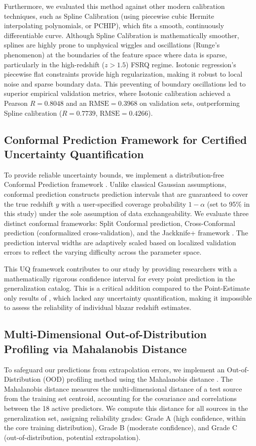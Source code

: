 \documentclass[twocolumn,linenumbers,floatfix]{aastex701}
\begin{document}
Furthermore, we evaluated this method against other modern calibration techniques, such as Spline Calibration (using piecewise cubic Hermite interpolating polynomials, or PCHIP), which fits a smooth, continuously differentiable curve. Although Spline Calibration is mathematically smoother, splines are highly prone to unphysical wiggles and oscillations (Runge's phenomenon) at the boundaries of the feature space where data is sparse, particularly in the high-redshift ($z > 1.5$) FSRQ regime. Isotonic regression's piecewise flat constraints provide high regularization, making it robust to local noise and sparse boundary data. This preventing of boundary oscillations led to superior empirical validation metrics, where Isotonic calibration achieved a Pearson $R = 0.8048$ and an $\text{RMSE} = 0.3968$ on validation sets, outperforming Spline calibration ($R = 0.7739$, $\text{RMSE} = 0.4266$).

\subsection{Conformal Prediction Framework for Certified Uncertainty Quantification}
\label{sec:conformal}
To provide reliable uncertainty bounds, we implement a distribution-free Conformal Prediction framework \citep{Vovk2005, Angelopoulos2021}. Unlike classical Gaussian assumptions, conformal prediction constructs prediction intervals that are guaranteed to cover the true redshift $y$ with a user-specified coverage probability $1-\alpha$ (set to 95\% in this study) under the sole assumption of data exchangeability. We evaluate three distinct conformal frameworks: Split Conformal prediction, Cross-Conformal prediction (conformalized cross-validation), and the Jackknife+ framework \citep{Barber2021}. The prediction interval widths are adaptively scaled based on localized validation errors to reflect the varying difficulty across the parameter space.

This UQ framework contributes to our study by providing researchers with a mathematically rigorous confidence interval for every point prediction in the generalization catalog. This is a critical addition compared to the Point-Estimate only results of \citet{Narendra2022}, which lacked any uncertainty quantification, making it impossible to assess the reliability of individual blazar redshift estimates.

\subsection{Multi-Dimensional Out-of-Distribution Profiling via Mahalanobis Distance}
\label{sec:mahalanobis}
To safeguard our predictions from extrapolation errors, we implement an Out-of-Distribution (OOD) profiling method using the Mahalanobis distance \citep{Mahalanobis1936, Rousseeuw1990}. The Mahalanobis distance measures the multi-dimensional distance of a test source from the training set centroid, accounting for the covariance and correlations between the 18 active predictors. We compute this distance for all sources in the generalization set, assigning reliability grades: Grade A (high confidence, within the core training distribution), Grade B (moderate confidence), and Grade C (out-of-distribution, potential extrapolation).
\end{document}
